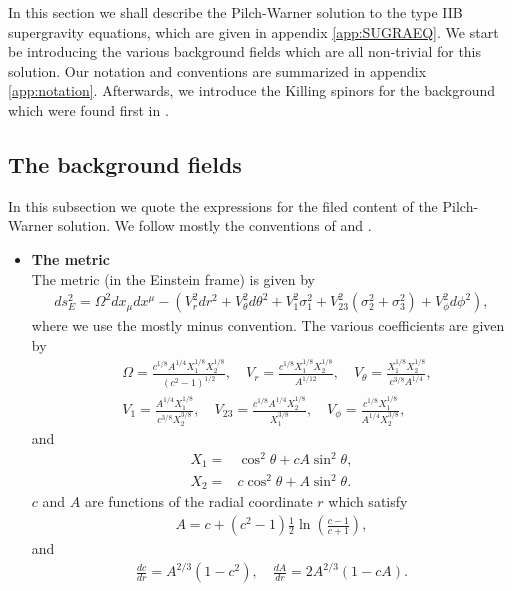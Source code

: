 \documentclass[11pt]{article}
\begin{document}
In this section we shall describe the Pilch-Warner solution to the type IIB supergravity equations, which are given in appendix \ref{app:SUGRAEQ}.
We start be introducing the various background fields which are all non-trivial for this solution.
Our notation and conventions are summarized in appendix \ref{app:notation}.
Afterwards, we introduce the Killing spinors for the background which were found first in \cite{Pilch:2003jg}.

\subsection{The background fields}
In this subsection we quote the expressions for the filed content of the Pilch-Warner solution.
We follow mostly the conventions of \cite{Pilch:2003jg} and \cite{Buchel:2000cn}.
\begin{itemize}
  \item \textbf{The metric}\\
The metric (in the Einstein frame) is given by
\begin{align}\label{eq:PWmetric}
ds_E^2 =
\Omega^2 dx_\mu dx^\mu -\left(
V_r^2 dr^2 + V_\theta^2 d\theta^2 + V_1^2 \sigma_1^2 + V_{23}^2 (\sigma_2^2 + \sigma_3^2) + V_\phi^2 d\phi^2\right),
\end{align}
where we use the mostly minus convention.
The various coefficients are given by
\begin{align}
& \Omega = \frac{c^{1/8} A^{1/4} X_1^{1/8} X_2^{1/8}}{(c^2 - 1)^{1/2}},\quad
V_r = \frac{c^{1/8}X_1^{1/8} X_2^{1/8}}{A^{1/12}},\quad
V_\theta = \frac{X_1^{1/8} X_2^{1/8}}{c^{3/8}A^{1/4}},\nonumber\\
&
V_1 = \frac{A^{1/4}X_1^{1/8} }{c^{3/8}X_2^{3/8}},\quad
V_{23} = \frac{c^{1/8}A^{1/4}X_2^{1/8} }{X_1^{3/8}},\quad
V_\phi = \frac{c^{1/8}X_1^{1/8} }{A^{1/4}X_2^{3/8}},
\end{align}
and
\begin{align}
X_1 = & \cos^2\theta + cA  \sin^2\theta,\nonumber\\
X_2 = & c \cos^2\theta + A  \sin^2\theta.
\end{align}
$c$ and $A$ are functions of the radial coordinate $r$ which satisfy
\begin{align}
A  = c+(c^2 - 1)\frac{1}{2}\ln\left(\frac{c-1}{c+1}\right),
\end{align}
and
\begin{align}
\frac{dc}{dr} = A^{2/3}(1-c^2),\quad
\frac{d A}{dr} = 2 A^{2/3}\left(1 - c A\right).
\end{align}

\end{itemize}
\end{document}

